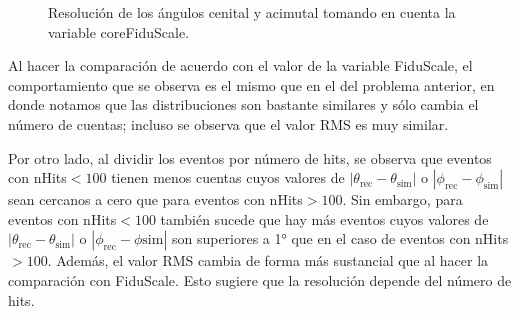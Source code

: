 \documentclass[11pt]{article}
\begin{document}
\begin{figure}[H]
\centering
{}

\caption{Resolución de los ángulos cenital y acimutal tomando en cuenta la variable coreFiduScale.}
\label{fig:Prob2BD}
\end{figure}

Al hacer la comparación de acuerdo con el valor de la variable FiduScale, el comportamiento que se observa es el mismo que en el del problema anterior, en donde notamos que las distribuciones son bastante similares y sólo cambia el número de cuentas; incluso se observa que el valor RMS es muy similar. 

\hspace{5mm}Por otro lado, al dividir los eventos por número de hits, se observa que eventos con nHits$<100$ tienen menos cuentas cuyos valores de $|\theta_{\textrm	{rec}} -\theta_{\textrm{sim}}|$ o $|\phi_{\textrm	{rec}} -\phi_{\textrm{sim}}|$ sean cercanos a cero que para eventos con nHits$>100$. Sin embargo, para eventos con nHits$<100$ también sucede que hay más eventos cuyos valores de $|\theta_{\textrm	{rec}} -\theta_{\textrm{sim}}|$ o $|\phi_{\textrm	{rec}} -\phi{\textrm{sim}}|$ son superiores a 1° que en el caso de eventos con nHits$>100$. Además, el valor RMS cambia de forma más sustancial que al hacer la comparación con FiduScale. Esto sugiere que la resolución depende del número de hits.
\pagebreak
\end{document}
